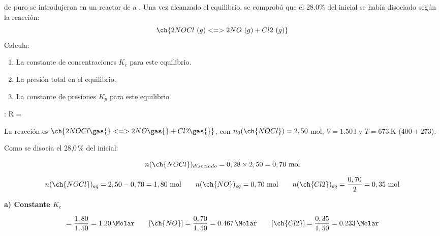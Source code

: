 \begin{exerciseEVAU}
     de  puro se introdujeron en un reactor de  a . Una vez alcanzado el equilibrio, se comprobó que el 28.0\% del  inicial se había disociado según la reacción:
    \begin{equation*}
        \ch{2 NOCl\ (g) <=> 2 NO\ (g) + Cl2\ (g)}
    \end{equation*}
    Calcula:
    \begin{enumerate}[label=\letraminuscula]
\item La constante de concentraciones \(K_c\)  para este equilibrio.
\item La presión total en el equilibrio.
\item La constante de presiones \(K_p\)  para este equilibrio.
    \end{enumerate}
    \datos{}: R = \ctegases


    \begin{solu}

        La reacción es \(\ch{2 NOCl \gas{} <=> 2 NO \gas{} + Cl2 \gas{}}\), con \(n_0(\ch{NOCl}) = 2,50\) mol, \(V = \SI{1.50}{\litre}\) y \(T = \SI{673}{\kelvin}\) (\(400+273\)).

        Como se disocia el 28,0\,\% del  inicial:

        \begin{equation*}
            n(\ch{NOCl})_{disociado} = 0,28 \times 2,50 = 0,70 \ \text{mol}
        \end{equation*}

        \begin{equation*}
            n(\ch{NOCl})_{eq} = 2,50 - 0,70 = 1,80 \ \text{mol} \qquad n(\ch{NO})_{eq} = 0,70 \ \text{mol} \qquad n(\ch{Cl2})_{eq} = \dfrac{0,70}{2} = 0,35 \ \text{mol}
        \end{equation*}

        \textbf{a) Constante \(K_c\)}

        \begin{equation*}
            [\ch{NOCl}] = \dfrac{1,80}{1,50} = \SI{1.20}{\Molar} \qquad [\ch{NO}] = \dfrac{0,70}{1,50} = \SI{0.467}{\Molar} \qquad [\ch{Cl2}] = \dfrac{0,35}{1,50} = \SI{0.233}{\Molar}
        \end{equation*}


\end{solu}
\end{exerciseEVAU}
